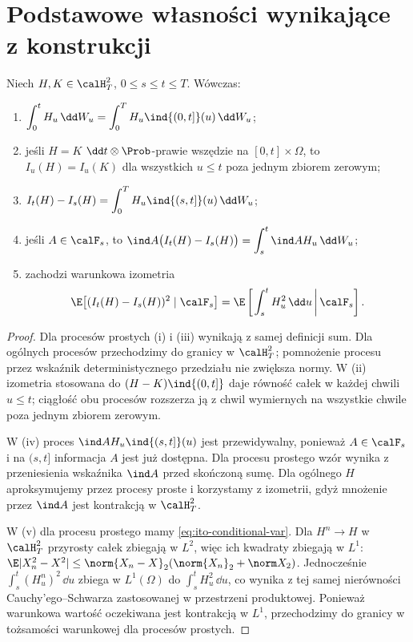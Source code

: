 \section{Podstawowe własności wynikające z konstrukcji}
\begin{twierdzenie}
\label{th:ito-properties}
Niech $H,K\in\calH_T^2$, $0\le s\le t\le T$.
Wówczas:
\begin{enumerate}[label=\textup{(\roman*)}]
\item $\displaystyle\int_0^tH_u\,\dd W_u
=\int_0^T H_u\ind{(0,t]}(u)\,\dd W_u$;
\item jeśli $H=K$ $\dd t\otimes\Prob$-prawie wszędzie
na $[0,t]\times\Omega$, to $I_u(H)=I_u(K)$ dla wszystkich
$u\le t$ poza jednym zbiorem zerowym;
\item $\displaystyle I_t(H)-I_s(H)=\int_0^TH_u\ind{(s,t]}(u)\,\dd W_u$;
\item jeśli $A\in\calF_s$, to
$\displaystyle\ind A\big(I_t(H)-I_s(H)\big)
=\int_s^t\ind A H_u\,\dd W_u$;
\item zachodzi warunkowa izometria
\[
\E\big[(I_t(H)-I_s(H))^2\mid\calF_s\big]
=\E\left[\left.\int_s^tH_u^2\,\dd u\,\right|\calF_s\right].
\]
\end{enumerate}
\end{twierdzenie}
\begin{proof}
Dla procesów prostych (i) i (iii) wynikają z samej
definicji sum. Dla ogólnych procesów przechodzimy
do granicy w $\calH_T^2$; pomnożenie procesu przez
wskaźnik deterministycznego przedziału nie zwiększa
normy. W (ii) izometria stosowana do $(H-K)\ind{(0,t]}$
daje równość całek w każdej chwili $u\le t$;
ciągłość obu procesów rozszerza ją z chwil wymiernych
na wszystkie chwile poza jednym zbiorem zerowym.

W (iv) proces $\ind A H_u\ind{(s,t]}(u)$ jest
przewidywalny, ponieważ $A\in\calF_s$ i na
$(s,t]$ informacja $A$ jest już dostępna. Dla procesu
prostego wzór wynika z przeniesienia wskaźnika $\ind A$
przed skończoną sumę. Dla ogólnego $H$ aproksymujemy
przez procesy proste i korzystamy z izometrii,
gdyż mnożenie przez $\ind A$ jest kontrakcją
w $\calH_T^2$.

W (v) dla procesu prostego mamy \eqref{eq:ito-conditional-var}.
Dla $H^n\to H$ w $\calH_T^2$ przyrosty całek
zbiegają w $L^2$, więc ich kwadraty zbiegają w $L^1$:
$\E|X_n^2-X^2|\le\norm{X_n-X}_2(\norm{X_n}_2+\norm X_2)$.
Jednocześnie $\int_s^t(H_u^n)^2\,\dd u$ zbiega
w $L^1(\Omega)$ do $\int_s^tH_u^2\,\dd u$,
co wynika z tej samej nierówności Cauchy'ego--Schwarza
zastosowanej w przestrzeni produktowej.
Ponieważ warunkowa wartość oczekiwana jest kontrakcją
w $L^1$, przechodzimy do granicy w tożsamości
warunkowej dla procesów prostych.
\end{proof}

